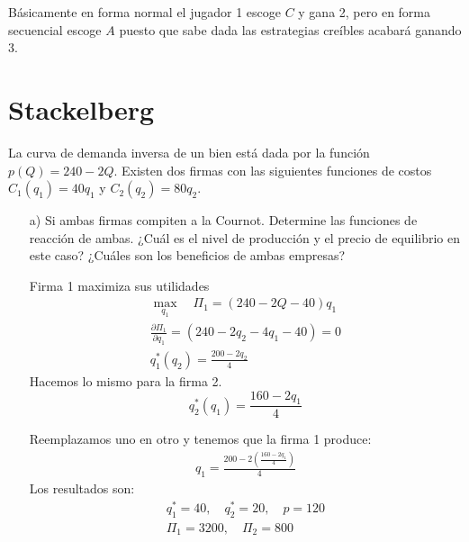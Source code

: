 \documentclass{exam}
\begin{document}
\begin{itemize}
\begin{solution}
        Básicamente en forma normal el jugador 1 escoge $C$ y gana 2, pero en forma secuencial escoge $A$ puesto que sabe dada las estrategias creíbles acabará ganando 3.
    \end{solution}
\end{itemize}

\section{Stackelberg}

La curva de demanda inversa de un bien está dada por la función \( p(Q) = 240 - 2Q \). 
Existen dos firmas con las siguientes funciones de costos \( C_1(q_1) = 40q_1 \) 
y \( C_2(q_2) = 80q_2 \).

\begin{itemize}
    \item[a)] Si ambas firmas compiten a la Cournot. Determine las funciones de reacción de ambas. 
    ¿Cuál es el nivel de producción y el precio de equilibrio en este caso? 
    ¿Cuáles son los beneficios de ambas empresas?
\begin{solution}
    Firma 1 maximiza sus utilidades
    \begin{align*}
        \max_{q_1} \quad \Pi_1 = (240 - 2Q - 40)q_1 \\
        \frac{\partial \Pi_1}{\partial q_1} = (240 - 2q_2 - 4q_1 - 40) = 0 \\
        q_1^*(q_2) = \frac{200 - 2q_2}{4}
    \end{align*}
    Hacemos lo mismo para la firma 2.
    \begin{equation*}
        q_2^*(q_1) = \frac{160-2q_1}{4}
    \end{equation*}

    Reemplazamos uno en otro y tenemos que la firma 1 produce:
    \begin{align*}
        q_1 = \frac{200 - 2\left(\frac{160 - 2q_1}{4}\right)}{4}
    \end{align*}
    Los resultados son:
    \begin{align*}
        q_1^* = 40, \quad q_2^* = 20, \quad  p = 120 \\
        \Pi_1 = 3200, \quad \Pi_2 = 800
    \end{align*}


\end{solution}
\end{itemize}
\end{document}
